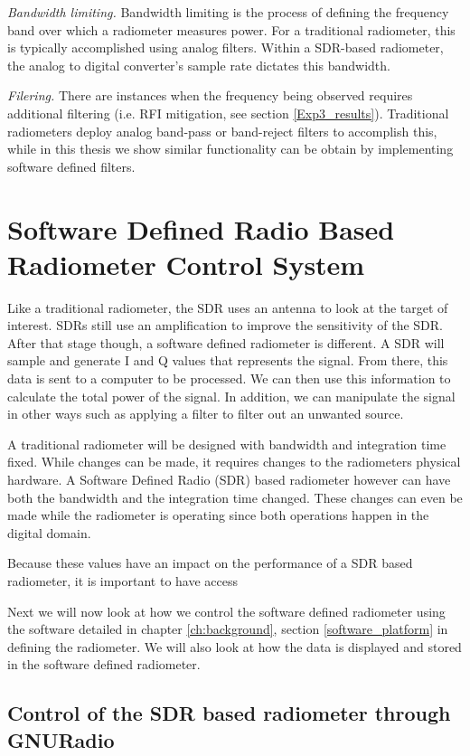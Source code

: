 \emph{Bandwidth limiting.}  Bandwidth limiting is the process of defining the frequency band over which a radiometer measures power.  For a traditional radiometer, this is typically accomplished using analog filters.  Within a SDR-based radiometer, the analog to digital converter's sample rate dictates this bandwidth.

\emph{Filering.}  There are instances when the frequency being observed requires additional filtering (i.e. RFI mitigation, see section \ref{Exp3_results}).  Traditional radiometers deploy analog band-pass or band-reject filters to accomplish this, while in this thesis we show similar functionality can be obtain by implementing software defined filters. 

\section{Software Defined Radio Based Radiometer Control System}

Like a traditional radiometer, the SDR uses an antenna to look at the target of interest.  SDRs still use an amplification to improve the sensitivity of the SDR. After that stage though, a software defined radiometer is different.  A SDR will sample and generate I and Q values that represents the signal.  From there, this data is sent to a computer to be processed.  We can then use this information to calculate the total power of the signal.  In addition, we can manipulate the signal in other ways such as applying a filter to filter out an unwanted source.

A traditional radiometer will be designed with bandwidth and integration time fixed.  While changes can be made, it requires changes to the radiometers physical hardware.  A Software Defined Radio (SDR) based radiometer however can have both the  bandwidth and the integration time changed.  These changes can even be made while the radiometer is operating since both operations happen in the digital domain.  

Because these values have an impact on the performance of a SDR based radiometer, it is important to have access 

Next we will now look at how we control the software defined radiometer using the software detailed in chapter \ref{ch:background}, section \ref{software_platform} in defining the radiometer.  We will also look at how the data is displayed and stored in the software defined radiometer.

\subsection{Control of the SDR based radiometer through GNURadio}

